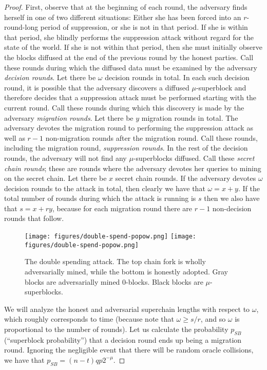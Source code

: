 \begin{proof}
First, observe that at the beginning of each round, the adversary finds herself
in one of two different situations: Either she has been forced into an
$r$-round-long period of suppression, or she is not in that period. If she is
within that period, she blindly performs the suppression attack without regard
for the state of the world. If she is not within that period, then she must
initially observe the blocks diffused at the end of the previous round by the
honest parties. Call these rounds during which the diffused data must be
examined by the adversary \emph{decision rounds}. Let there be $\omega$
decision rounds in total. In each such decision round, it is possible that the
adversary discovers a diffused $\mu$-superblock and therefore decides that a
suppression attack must be performed starting with the current round. Call these
rounds during which this discovery is made by the adversary \emph{migration
rounds}. Let there be $y$ migration rounds in total. The adversary devotes the
migration round to performing the suppression attack as well as $r - 1$
non-migration rounds after the migration round. Call these rounds, including the
migration round, \emph{suppression rounds}. In the rest of the decision
rounds, the adversary will not find any $\mu$-superblocks diffused. Call these
\emph{secret chain rounds}; these are rounds where the adversary devotes her
queries to mining on the secret chain. Let there be $x$ secret chain rounds. If
the adversary devotes $\omega$ decision rounds to the attack in total, then
clearly we have that $\omega = x + y$. If the total number of rounds during
which the attack is running is $s$ then we also have that $s = x + ry$, because
for each migration round there are $r - 1$ non-decision rounds that follow.

\begin{figure*}[t]
    \caption{The double spending attack.
    The top chain fork is wholly adversarially mined, while the bottom is
    honestly adopted. Gray blocks are adversarially mined 0-blocks.
    Black blocks are $\mu$-superblocks.}
    \centering
    \iftwocolumn
        \texttt{[image: figures/double-spend-popow.png]}
    \else
        \texttt{[image: figures/double-spend-popow.png]}
    \fi
    \label{fig.double-spend}
\end{figure*}

We will analyze the honest and adversarial superchain lengths with respect to
$\omega$, which roughly corresponds to time (because note that $\omega \geq
s/r$, and so $\omega$ is proportional to the number of rounds).
Let us calculate the probability $p_{SB}$ (``superblock probability'') that a
decision round ends up being a migration round. Ignoring the negligible event
that there will be random oracle collisions, we have that $p_{SB} = (n -
t)qp2^{-\mu}$.


\end{proof}

